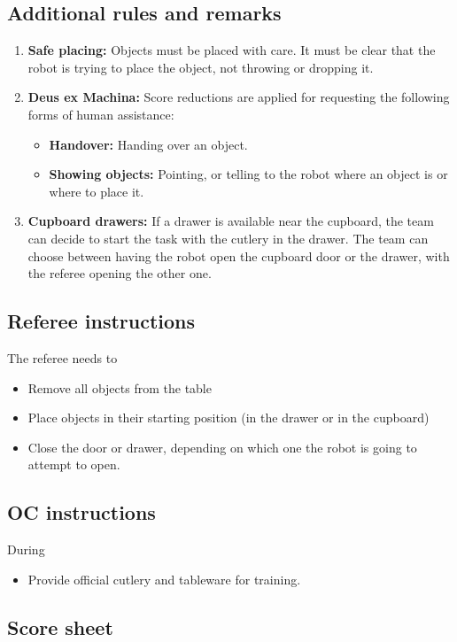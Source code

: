 \subsection*{Additional rules and remarks}
\begin{enumerate}[nosep]
	\item \textbf{Safe placing:} Objects must be placed with care. It must be clear that the robot is trying to place the object, not throwing or dropping it.

	\item \textbf{Deus ex Machina:} Score reductions are applied for requesting the following forms of human assistance:
	\begin{itemize}[nosep]
		\item \textbf{Handover:} Handing over an object.
		
		\item \textbf{Showing objects:} Pointing, or telling to the robot where an object is or where to place it.

	\end{itemize}

	\item \textbf{Cupboard drawers:} If a drawer is available near the cupboard, the team can decide to start the task with the cutlery in the drawer. The team can choose between having the robot open the cupboard door or the drawer, with the referee opening the other one.

\end{enumerate}

\subsection*{Referee instructions}

The referee needs to
\begin{itemize}
	\item Remove all objects from the table
	\item Place objects in their starting position (in the drawer or in the cupboard)
	\item Close the door or drawer, depending on which one the robot is going to attempt to open.
\end{itemize}

\subsection*{OC instructions}
During \SetupDays
\begin{itemize}
	\item Provide official cutlery and tableware for training.
\end{itemize}

\subsection*{Score sheet}



